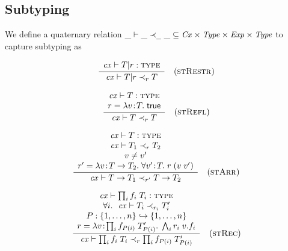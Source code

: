 
\subsection{Subtyping}

We define a quaternary relation $\_\vdash\_\prec_{\_}\_\subseteq\mathit{Cx}\times\mathit{Type}\times\mathit{Exp}\times\mathit{Type}$ to
capture subtyping as

\[
\frac{\begin{array}{c}\mathit{cx}\vdash T|r:\textsc{type}\end{array}}{\mathit{cx}\vdash T|r\prec_{r}T}\quad\mbox{(\textsc{stRestr})}
\]

\[
\frac{\begin{array}{c}\mathit{cx}\vdash T:\textsc{type}\\r=\lambda v\!:\!T.\;\mathsf{true}\end{array}}{\mathit{cx}\vdash T\prec_{r}T}\quad\mbox{(\textsc{stRefl})}
\]

\[
\frac{\begin{array}{c}\mathit{cx}\vdash T:\textsc{type}\\\mathit{cx}\vdash T_1\prec_{r}T_2\\v\neq v'\\r'=\lambda v\!:\!T\to T_2.\;\forall v'\!:\!T.\;r\;(v\;v')\end{array}}{\mathit{cx}\vdash T\to T_1\prec_{r'}T\to T_2}\quad\mbox{(\textsc{stArr})}
\]

\[
\frac{\begin{array}{c}\mathit{cx}\vdash\prod_{i}f_i\;T_i:\textsc{type}\\\forall i.\ \ \mathit{cx}\vdash T_i\prec_{r_i}T_i'\\P:\{1,\ldots,n\}\hookrightarrow\{1,\ldots,n\}\\r=\lambda v\!:\!\prod_{i}f_{P(i)}\;T_{P(i)}'.\;\bigwedge_{i}r_i\;v.f_i\end{array}}{\mathit{cx}\vdash\prod_{i}f_i\;T_i\prec_{r}\prod_{i}f_{P(i)}\;T_{P(i)}'}\quad\mbox{(\textsc{stRec})}
\]

